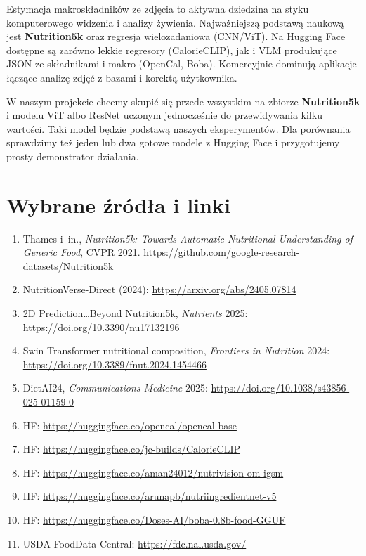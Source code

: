 \documentclass[11pt,a4paper]{article}
\begin{document}
Estymacja makroskładników ze zdjęcia to aktywna dziedzina na styku
komputerowego widzenia i analizy żywienia. Najważniejszą podstawą naukową
jest \textbf{Nutrition5k} oraz regresja wielozadaniowa (CNN/ViT).
Na Hugging Face dostępne są zarówno lekkie regresory (CalorieCLIP),
jak i VLM produkujące JSON ze składnikami i makro (OpenCal, Boba).
Komercyjnie dominują aplikacje łączące analizę zdjęć z bazami i korektą użytkownika.

W naszym projekcie chcemy skupić się przede wszystkim na zbiorze
\textbf{Nutrition5k} i modelu ViT albo ResNet uczonym jednocześnie do
przewidywania kilku wartości. Taki model będzie podstawą naszych
eksperymentów. Dla porównania sprawdzimy też jeden lub dwa gotowe modele
z Hugging Face i przygotujemy prosty demonstrator działania.

\section*{Wybrane źródła i linki}

\begin{enumerate}[leftmargin=*,itemsep=0.35em]
  \item Thames i~in., \emph{Nutrition5k: Towards Automatic Nutritional Understanding of Generic Food}, CVPR 2021.
        \url{https://github.com/google-research-datasets/Nutrition5k}
  \item NutritionVerse-Direct (2024): \url{https://arxiv.org/abs/2405.07814}
  \item 2D Prediction\ldots Beyond Nutrition5k, \emph{Nutrients} 2025:
        \url{https://doi.org/10.3390/nu17132196}
  \item Swin Transformer nutritional composition, \emph{Frontiers in Nutrition} 2024:
        \url{https://doi.org/10.3389/fnut.2024.1454466}
  \item DietAI24, \emph{Communications Medicine} 2025:
        \url{https://doi.org/10.1038/s43856-025-01159-0}
  \item HF: \url{https://huggingface.co/opencal/opencal-base}
  \item HF: \url{https://huggingface.co/jc-builds/CalorieCLIP}
  \item HF: \url{https://huggingface.co/aman24012/nutrivision-om-igsm}
  \item HF: \url{https://huggingface.co/arunapb/nutriingredientnet-v5}
  \item HF: \url{https://huggingface.co/Doses-AI/boba-0.8b-food-GGUF}
  \item USDA FoodData Central: \url{https://fdc.nal.usda.gov/}
\end{enumerate}
\end{document}
